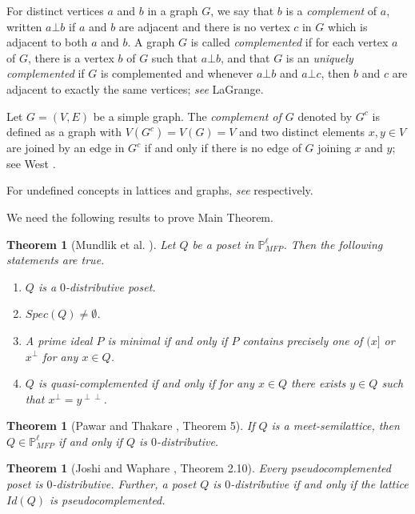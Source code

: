 \documentclass[10pt,one side,emlines]{amsart}
\newtheorem{theorem}[lem]{Theorem}
\theoremstyle{definition}
\begin{document}
For distinct vertices $a$ and $b$ in a graph $G$, we say that $b$ is a \textit{complement} of $a$, written $a\bot b$ if $a$ and $b$ are adjacent and there is no vertex $c$ in $G$ which is adjacent to both $a$ and $b$. A graph $G$ is called \textit{complemented} if for each vertex $a$ of $G$, there is a vertex $b$ of $G$ such that $a\bot b$, and that $G$ is an \textit{uniquely complemented} if $G$ is complemented and whenever $a\bot b$ and $a\bot c$, then $b$ and $c$ are adjacent to exactly the same vertices; {\it see} LaGrange\cite{L}.

 Let $G=(V,E)$ be a simple graph. The \textit{complement of $G$} denoted by $G^c$ is defined as a graph with $V(G^c)= V(G)=V$ and two distinct elements $x, y\in V$ are joined by an edge in $G^c$ if and only if there is no edge of $G$ joining $x$ and $y$; see West \cite{W}.

For undefined concepts in lattices and graphs, {\it see} \cite{G, W} respectively.

We need the following results to prove  Main Theorem.

\begin{theorem}[Mundlik et al. \cite {MJH}]\label{2.3'}
	Let $Q$ be a poset in $\mathbb{P}^{\ell}_{MFP}$. Then the following statements are true.
	\begin{enumerate}
		\item[i)] $Q$ is a $0$-distributive poset.
		\item[ii)] $Spec(Q)\neq \emptyset$.
		\item[iii)] A prime ideal $P$ is minimal if and only if $P$ contains precisely one of $(x]$ or $x^{\perp }$ for any $x \in Q$.
		\item[iv)] $Q$ is quasi-complemented if and only if for any $x \in Q$ there exists $y \in Q$ such that $x^{\perp}= y^{\perp \perp}$.
	\end{enumerate}
\end{theorem}

\begin{theorem}[Pawar and Thakare \cite{PT 1}, Theorem 5]\label{2.3}
	If $Q$ is a meet-semilattice, then $Q\in \mathbb{P}^{\ell}_{MFP}$ if and only if $Q$ is $0$-distributive.
\end{theorem}

\begin{theorem}[Joshi and Waphare \cite{JW}, Theorem 2.10]\label{2.4'}
	Every pseudocomplemented poset is $0$-distributive. Further, a poset $Q$ is $0$-distributive if and only if the lattice $Id(Q)$ is pseudocomplemented.
\end{theorem}
\end{document}
